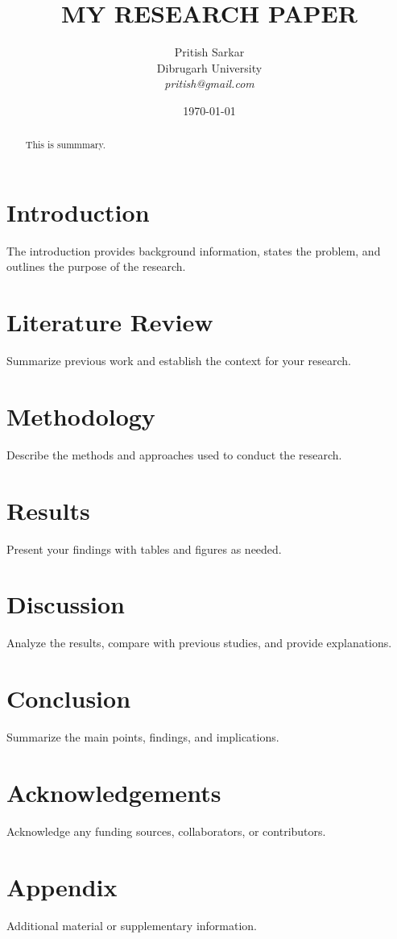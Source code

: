 \documentclass[12pt]{article}
\title{MY RESEARCH PAPER}
\author{Pritish Sarkar \\
         \large{Dibrugarh University} \\
        \textit{pritish@gmail.com}}
\date{\today}
\begin{document}
\maketitle

\begin{abstract}
 This is summmary.
\end{abstract}

\section{Introduction}
The introduction provides background information, states the problem, and outlines the purpose of the research.

\section{Literature Review}
Summarize previous work and establish the context for your research.

\section{Methodology}
Describe the methods and approaches used to conduct the research.

\section{Results}
Present your findings with tables and figures as needed.

\section{Discussion}
Analyze the results, compare with previous studies, and provide explanations.

\section{Conclusion}
Summarize the main points, findings, and implications.

\section*{Acknowledgements}
Acknowledge any funding sources, collaborators, or contributors.

\appendix
\section{Appendix}
Additional material or supplementary information.
\end{document}
